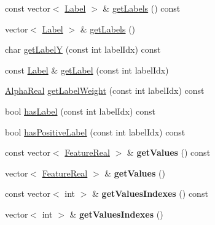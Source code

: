 \begin{DoxyCompactItemize}
\item 
const vector$<$ \hyperlink{structMultiBoost_1_1Label}{Label} $>$ \& \hyperlink{classMultiBoost_1_1Example_aabd5a3f5b7b7f81d4d8d4809bbd47876}{get\-Labels} () const 
\item 
vector$<$ \hyperlink{structMultiBoost_1_1Label}{Label} $>$ \& \hyperlink{classMultiBoost_1_1Example_a61f200395a444ab55c6df2c57b079b73}{get\-Labels} ()
\item 
char \hyperlink{classMultiBoost_1_1Example_ae78a2e59ce2fc14a9a53d93aef312e9f}{get\-Label\-Y} (const int label\-Idx) const 
\item 
const \hyperlink{structMultiBoost_1_1Label}{Label} \& \hyperlink{classMultiBoost_1_1Example_a988f978710235d6c66f54ce60db182a7}{get\-Label} (const int label\-Idx)
\item 
\hyperlink{Defaults_8h_a80184c4fd10ab70a1a17c5f97dcd1563}{Alpha\-Real} \hyperlink{classMultiBoost_1_1Example_a850c81c9561c26c95a26f194951af5e1}{get\-Label\-Weight} (const int label\-Idx) const 
\item 
bool \hyperlink{classMultiBoost_1_1Example_afc8ee241a1e5eee54ed8cff72034755e}{has\-Label} (const int label\-Idx) const 
\item 
bool \hyperlink{classMultiBoost_1_1Example_a361097d9ea08f7130a79841f3fb5bc2b}{has\-Positive\-Label} (const int label\-Idx) const 
\item 
\hypertarget{classMultiBoost_1_1Example_a9c274044bd90e1abc606043d4fccdfd2}{const vector$<$ \hyperlink{Defaults_8h_a3a11cfe6a5d469d921716ca6291e934f}{Feature\-Real} $>$ \& {\bfseries get\-Values} () const }\label{classMultiBoost_1_1Example_a9c274044bd90e1abc606043d4fccdfd2}

\item 
\hypertarget{classMultiBoost_1_1Example_ae6688a1d16aab416dd9c667be538ea24}{vector$<$ \hyperlink{Defaults_8h_a3a11cfe6a5d469d921716ca6291e934f}{Feature\-Real} $>$ \& {\bfseries get\-Values} ()}\label{classMultiBoost_1_1Example_ae6688a1d16aab416dd9c667be538ea24}

\item 
\hypertarget{classMultiBoost_1_1Example_a94965fe47a392b79c986e43a75d448cc}{const vector$<$ int $>$ \& {\bfseries get\-Values\-Indexes} () const }\label{classMultiBoost_1_1Example_a94965fe47a392b79c986e43a75d448cc}

\item 
\hypertarget{classMultiBoost_1_1Example_ad3222524a810b7f38f910ba03f76e912}{vector$<$ int $>$ \& {\bfseries get\-Values\-Indexes} ()}\label{classMultiBoost_1_1Example_ad3222524a810b7f38f910ba03f76e912}


\end{DoxyCompactItemize}

